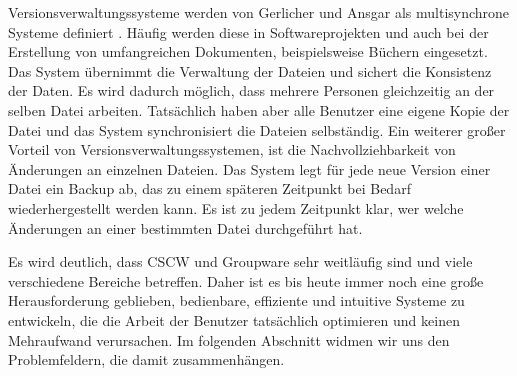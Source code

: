 Versionsverwaltungssysteme werden von Gerlicher und Ansgar als multisynchrone Systeme definiert \citep{Gerlicher:2007p241}. Häufig werden diese in Softwareprojekten und auch bei der Erstellung von umfangreichen Dokumenten, beispielsweise Büchern eingesetzt. Das System übernimmt die Verwaltung der Dateien und sichert die Konsistenz der Daten. Es wird dadurch möglich, dass mehrere Personen gleichzeitig an der selben Datei arbeiten. Tatsächlich haben aber alle Benutzer eine eigene Kopie der Datei und das System synchronisiert die Dateien selbständig. Ein weiterer großer Vorteil von Versionsverwaltungssystemen, ist die Nachvollziehbarkeit von Änderungen \citep{Gerlicher:2007p241} an einzelnen Dateien. Das System legt für jede neue Version einer Datei ein Backup ab, das zu einem späteren Zeitpunkt bei Bedarf wiederhergestellt werden kann. Es ist zu jedem Zeitpunkt klar, wer welche Änderungen an einer bestimmten Datei durchgeführt hat. 

\bigskip Es wird deutlich, dass CSCW und Groupware sehr weitläufig sind und viele verschiedene Bereiche betreffen. Daher ist es bis heute immer noch eine große Herausforderung geblieben, bedienbare, effiziente und intuitive Systeme zu entwickeln, die die Arbeit der Benutzer tatsächlich optimieren und keinen Mehraufwand verursachen. Im folgenden Abschnitt widmen wir uns den Problemfeldern, die damit zusammenhängen.

